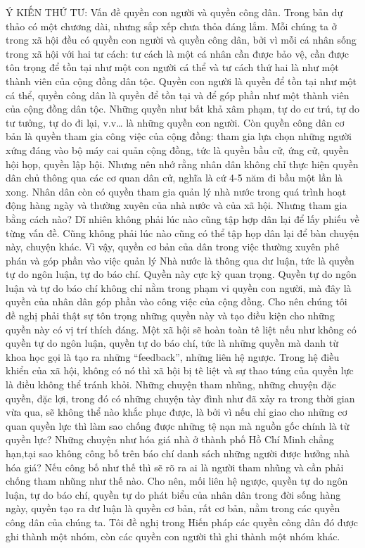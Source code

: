 Ý KIẾN THỨ TƯ: Vấn đề quyền con người và quyền công dân. Trong bản dự thảo có một chương dài, nhưng sắp xếp chưa thỏa đáng lắm. Mỗi chúng ta ở trong xã hội đều có quyền con người và quyền công dân, bởi vì mỗi cá nhân sống trong xã hội với hai tư cách: tư cách là một cá nhân cần được bảo vệ, cần được tôn trọng để tồn tại như một con người cá thể và tư cách thứ hai là như một thành viên của cộng đồng dân tộc. Quyền con người là quyền để tồn tại như một cá thể, quyền công dân là quyền để tồn tại và để góp phần như một thành viên của cộng đồng dân tộc. Những quyền như bất khả xâm phạm, tự do cư trú, tự do tư tưởng, tự do đi lại, v.v… là những quyền con người. Còn quyền công dân cơ bản là quyền tham gia công việc của cộng đồng: tham gia lựa chọn những người xứng đáng vào bộ máy cai quản cộng đồng, tức là quyền bầu cử, ứng cử, quyền hội họp, quyền lập hội. Nhưng nên nhớ rằng nhân dân không chỉ thực hiện quyền dân chủ thông qua các cơ quan dân cử, nghĩa là cứ 4-5 năm đi bầu một lần là xong. Nhân dân còn có quyền tham gia quản lý nhà nước trong quá trình hoạt động hàng ngày và thường xuyên của nhà nước và của xã hội. Nhưng tham gia bằng cách nào? Dĩ nhiên không phải lúc nào cũng tập hợp dân lại để lấy phiếu về từng vấn đề. Cũng không phải lúc nào cũng có thể tập họp dân lại để bàn chuyện này, chuyện khác. Vì vậy, quyền cơ bản của dân trong việc thường xuyên phê phán và góp phần vào việc quản lý Nhà nước là thông qua dư luận, tức là quyền tự do ngôn luận, tự do báo chí. Quyền này cực kỳ quan trọng. Quyền tự do ngôn luận và tự do báo chí không chỉ nằm trong phạm vi quyền con người, mà đây là quyền của nhân dân góp phần vào công việc của cộng đồng. Cho nên chúng tôi đề nghị phải thật sự tôn trọng những quyền này và tạo điều kiện cho những quyền này có vị trí thích đáng. Một xã hội sẽ hoàn toàn tê liệt nếu như không có quyền tự do ngôn luận, quyền tự do báo chí, tức là những quyền mà danh từ khoa học gọi là tạo ra những “feedback”, những liên hệ ngược. Trong hệ điều khiển của xã hội, không có nó thì xã hội bị tê liệt và sự thao túng của quyền lực là điều không thể tránh khỏi. Những chuyện tham nhũng, những chuyện đặc quyền, đặc lợi, trong đó có những chuyện tày đình như đã xảy ra trong thời gian vừa qua, sẽ không thể nào khắc phục được, là bởi vì nếu chỉ giao cho những cơ quan quyền lực thì làm sao chống được những tệ nạn mà nguồn gốc chính là từ quyền lực? Những chuyện như hóa giá nhà ở thành phố Hồ Chí Minh chẳng hạn,tại sao không công bố trên báo chí danh sách những người được hưởng nhà hóa giá? Nếu công bố như thế thì sẽ rõ ra ai là người tham nhũng và cần phải chống tham nhũng như thế nào. Cho nên, mối liên hệ ngược, quyền tự do ngôn luận, tự do báo chí, quyền tự do phát biểu của nhân dân trong đời sống hàng ngày, quyền tạo ra dư luận là quyền cơ bản, rất cơ bản, nằm trong các quyền công dân của chúng ta. Tôi đề nghị trong Hiến pháp các quyền công dân đó được ghi thành một nhóm, còn các quyền con người thì ghi thành một nhóm khác.

